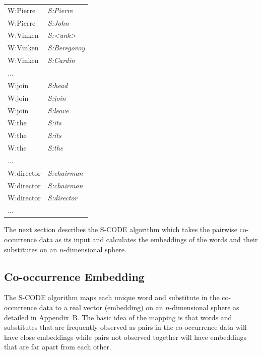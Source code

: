 \begin{table}[ht]
\begin{tabular}{|ll|}
W:Pierre & \textit{S:Pierre}\\
W:Pierre & \textit{S:John}\\
W:Vinken & \textit{S:<unk>}\\
W:Vinken & \textit{S:Beregovoy}\\
W:Vinken & \textit{S:Cardin}\\
$\hdots$&\\
W:join & \textit{S:head}\\
W:join & \textit{S:join}\\
W:join & \textit{S:leave}\\
W:the & \textit{S:its}\\
W:the & \textit{S:its}\\
W:the & \textit{S:the}\\
$\hdots$&\\
W:director & \textit{S:chairman}\\
W:director & \textit{S:chairman}\\
W:director & \textit{S:director}\\
$\hdots$&\\
\hline
\end{tabular}
\label{tab:samples}
\end{table}

The next section describes the S-CODE algorithm which takes the
pairwise co-occurrence data as its input and calculates the embeddings
of the words and their substitutes on an $n$-dimensional sphere.

\subsection{Co-occurrence Embedding}
\label{sec:embedding}
The S-CODE algorithm maps each unique word and substitute in the
co-occurrence data to a real vector (embedding) on an $n$-dimensional
sphere as detailed in Appendix~B.  The basic idea of the mapping is
that words and substitutes that are frequently observed as pairs in
the co-occurrence data will have close embeddings while pairs
not observed together will have embeddings that are far apart from each
other.

